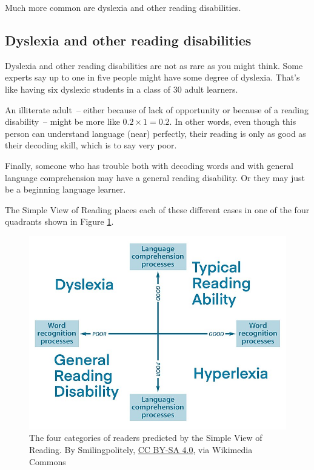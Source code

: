 Much more common are dyslexia and other reading disabilities.

\subsection{Dyslexia and other reading disabilities}

Dyslexia and other reading disabilities are not as rare as you might think. Some experts say up to one in five people might have some degree of dyslexia. That's like having six dyslexic students in a class of 30 adult learners.

An illiterate adult~-- either because of lack of opportunity or because of a reading disability~-- might be more like $0.2\times1=0.2$. In other words, even though this person can understand language (near) perfectly, their reading is only as good as their decoding skill, which is to say very poor.

Finally, someone who has trouble both with decoding words and with general language comprehension may have a general reading disability. Or they may just be a beginning language learner.

The Simple View of Reading places each of these different cases in one of the four quadrants shown in Figure \ref{fig:simple-view-quadrants}.

\begin{figure}
    \centering
    \includegraphics[width=0.8\linewidth]{figures/Simple_View_of_Reading_quadrant_visualisation.jpg}
    \caption{The four categories of readers predicted by the Simple View of Reading. By Smilingpolitely, \href{https://creativecommons.org/licenses/by-sa/4.0}{CC BY-SA 4.0}, via Wikimedia Commons}
    \label{fig:simple-view-quadrants}
\end{figure}

